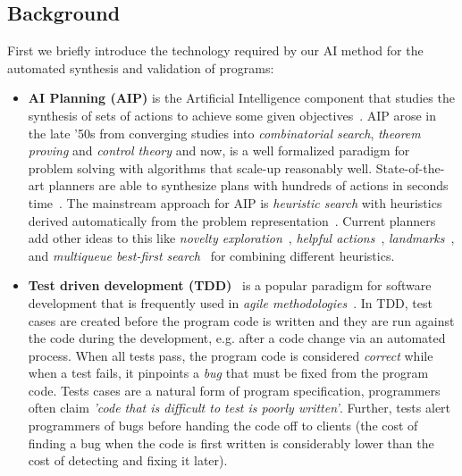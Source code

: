 \documentclass[10pt,a4paper]{paper}
\begin{document}
\subsection{Background}
First we briefly introduce the technology required by our AI method for the automated synthesis and validation of programs:
\begin{itemize}
\item {\bf AI Planning (AIP)} is the Artificial Intelligence component that studies the synthesis of sets of actions to achieve some given objectives~\cite{ghallab2004automated}. AIP arose in the late ’50s from converging studies into {\em combinatorial search}, {\em theorem proving} and {\em control theory} and now, is a well formalized paradigm for problem solving with algorithms that scale-up reasonably well. State-of-the-art planners are able to synthesize plans with hundreds of actions in seconds time~\cite{geffner2013concise}.  The mainstream approach for AIP is {\em heuristic search} with heuristics derived automatically from the problem representation~\cite{mcdermott1996heuristic,bonet2001planning}.  Current planners add other ideas to this like {\it novelty exploration}~\cite{geffner:psimulators:IJCAI17}, {\it helpful actions}~\cite{hoffmann2001ff}, {\it landmarks}~\cite{helmert2006fast}, and {\it multiqueue best-first search}~\cite{richter2010lama} for combining different heuristics.
  
\item {\bf Test driven development (TDD)}~\cite{beck:TDD:2003} is a popular paradigm for software development that is frequently used in {\it agile methodologies}~\cite{cohen2003agile}. In TDD, test cases are created before the program code is written and they are run against the code during the development, e.g. after a code change via an automated process. When all tests pass, the program code is considered {\em correct} while when a test fails, it pinpoints a {\em bug} that must be fixed from the program code. Tests cases are a natural form of program specification, programmers often claim {\em 'code that is difficult to test is poorly written'}. Further, tests alert programmers of bugs before handing the code off to clients (the cost of finding a bug when the code is first written is considerably lower than the cost of detecting and fixing it later). %
\end{itemize}
\end{document}

